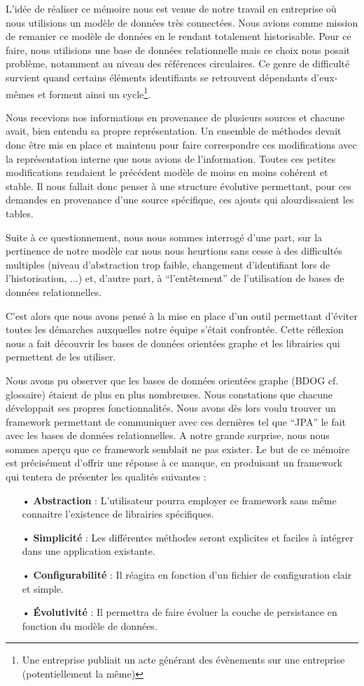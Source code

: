 \documentclass[a4paper,fleqn,12pt,oneside]{book}
\begin{document}
L'idée de réaliser ce mémoire nous est venue de notre travail en entreprise où nous utilisions un modèle de données très connectées. Nous avions comme mission de remanier ce modèle de données en le rendant totalement historisable. Pour ce faire, nous utilisions une base de données relationnelle mais ce choix nous posait problème, notamment au niveau des références circulaires. Ce genre de difficulté survient quand certains éléments identifiants se retrouvent dépendants d'eux-mêmes et forment ainsi un cycle\footnote{Une entreprise publiait un acte générant des évènements sur une entreprise (potentiellement la même)}. 

Nous recevions nos informations en provenance de plusieurs sources et chacune avait, bien entendu sa propre représentation. Un ensemble de méthodes devait donc être mis en place et maintenu pour faire correspondre ces modifications avec la représentation interne que nous avions de l'information. Toutes ces petites modifications rendaient le précédent modèle de moins en moins cohérent et stable. Il nous fallait donc penser à une structure évolutive permettant, pour ces demandes en provenance d'une source spécifique, ces ajouts qui alourdissaient les tables. 

Suite à ce questionnement, nous nous sommes interrogé d'une part, sur la pertinence de notre modèle car nous nous heurtions sans cesse à des difficultés multiples (niveau d'abstraction trop faible, changement d'identifiant lors de l'historisation, ...) et, d'autre part, à \enquote{l'entêtement} de l'utilisation de bases de données relationnelles. 

C'est alors que nous avons pensé à la mise en place d'un outil permettant d'éviter toutes les démarches auxquelles notre équipe s'était confrontée. Cette réflexion nous a fait découvrir les bases de données orientées graphe et les librairies qui permettent de les utiliser.

Nous avons pu observer que les bases de données orientées graphe (BDOG cf. glossaire) étaient de plus en plus nombreuses. Nous constations que chacune développait ses propres fonctionnalités. Nous avons dès lors voulu trouver un framework permettant de communiquer avec ces dernières tel que \enquote{JPA} le fait avec les bases de données relationnelles. A notre grande surprise, nous nous sommes aperçu que ce framework semblait ne pas exister.
\newpage
Le but de ce mémoire est précisément d'offrir une réponse à ce manque, en produisant un framework qui tentera de présenter les qualités suivantes :
\begin{itemize}
\item[•] \textbf{Abstraction} : L'utilisateur pourra employer ce framework sans même connaitre l'existence de librairies spécifiques.
\item[•] \textbf{Simplicité} : Les différentes méthodes seront explicites et faciles à intégrer dans une application existante.
\item[•] \textbf{Configurabilité} : Il réagira en fonction d'un fichier de configuration clair et simple.
\item[•] \textbf{\'Evolutivité} : Il permettra de faire évoluer la couche de persistance en fonction du modèle de données.
\end{itemize}
\end{document}
